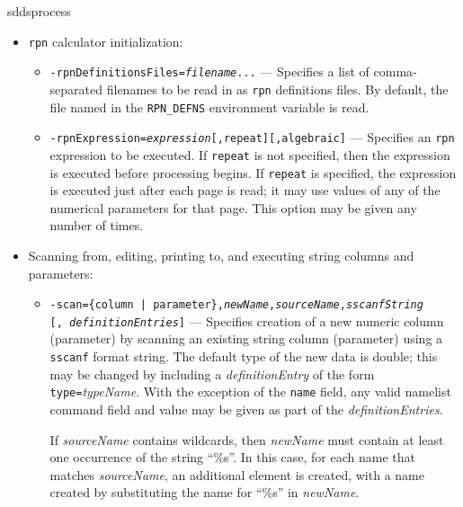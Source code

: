 \begin{sddsprog}{sddsprocess}
\begin{itemize}
\begin{itemize}
        \item {\tt -sample={\em fraction}} --- Specifies random sampling of rows such that approximately the indicated
fraction is kept.  Since a random number generator is used that is seeded with the system clock, this will usually
never be the same twice.

        \end{itemize}
    \item \verb|rpn| calculator initialization:\\

        \begin{itemize} \item {\tt -rpnDefinitionsFiles={\em filename}...} --- Specifies a list of comma-separated
filenames to be read in as \verb|rpn| definitions files.  By default, the file named in the {\tt RPN\_DEFNS}
environment variable is read.

        \item {\tt -rpnExpression={\em expression}[,repeat][,algebraic]} --- Specifies an \verb|rpn| expression to be executed.  If
{\tt repeat} is not specified, then the expression is executed before processing begins.  If {\tt repeat} is specified,
the expression is executed just after each page is read; it may use values of any of the numerical parameters for that
page. This option may be given any number of times.

        \end{itemize}
  \item Scanning from, editing, printing to, and executing string columns and parameters: \\

         \begin{itemize}
 
         \item {\tt -scan=\{column | parameter\},{\em newName},{\em sourceName},{\em sscanfString}}\\ {\tt [,{\em
 definitionEntries}]} --- Specifies creation of a new numeric column (parameter) by scanning an existing string column
 (parameter) using a \verb|sscanf| format string.  The default type of the new data is double; this may be changed by
 including a {\em definitionEntry} of the form {\tt type=}{\em typeName}.  With the exception of the {\tt name} field,
 any valid namelist command field and value may be given as part of the {\em definitionEntries}.

        If {\em sourceName} contains wildcards, then {\em newName} must contain at least one occurrence of the string
``\%s''.  In this case, for each name that matches {\em sourceName}, an additional element is created, with a
name created by substituting the name for ``\%s'' in {\em newName}.
 

\end{itemize}
\end{itemize}
\end{sddsprog}
